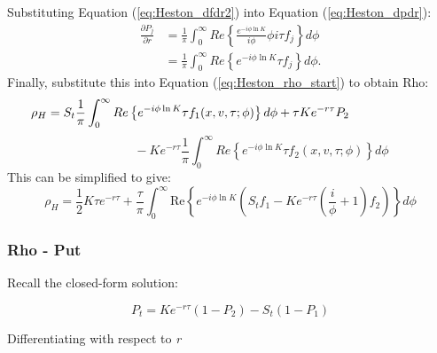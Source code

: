 \documentclass[a4paper]{article}
\begin{document}
Substituting Equation (\ref{eq:Heston_dfdr2}) into Equation (\ref{eq:Heston_dpdr}):
\begin{align*}
	\frac{\partial P_j}{\partial r} & = \frac{1}{\pi}\int_0^{\infty} Re \left\{ \frac{e^{-i\phi \ln K}}{i\phi} \phi i\tau f_j \right\} d\phi \\
	& = \frac{1}{\pi}\int_0^{\infty} Re \left\{ e^{-i\phi \ln K} \tau f_j \right\} d\phi. 
\end{align*}
Finally, substitute this into Equation (\ref{eq:Heston_rho_start}) to obtain Rho:
\begin{equation*}
	\hspace{-65pt} \rho_H = S_t\frac{1}{\pi} \int_0^{\infty} Re \left\{ e^{-i\phi \ln K}\tau f_1(x,v,\tau;\phi) \right\} d\phi + \tau Ke^{-r\tau}P_2
\end{equation*}
\begin{equation}
	\hspace{60pt} -Ke^{-r\tau}\frac{1}{\pi}\int_0^{\infty} Re \left\{ e^{-i\phi \ln K}\tau f_2(x,v,\tau;\phi) \right\} d\phi
\end{equation}
This can be simplified to give:
\[\rho_H=\frac{1}{2}K\tau e^{-r\tau} +\frac{\tau}{\pi}\int_0^\infty \mbox{Re}\left\{e^{-i\phi \ln K} \left(S_t f_1-Ke^{-r\tau}\left(\frac{i}{\phi}+1\right)f_2\right)\right\} d\phi\]




\newpage






\subsubsection*{Rho - Put}




Recall the closed-form solution:

\begin{equation}
	P_t = Ke^{-r\tau}(1-P_2) -  S_t(1-P_1)
	\label{eq:Heston_C}
\end{equation}

Differentiating with respect to \textit{r}
\end{document}
